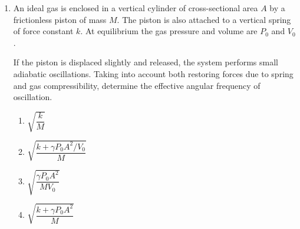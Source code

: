\documentclass[12pt]{article}
\begin{document}
\begin{enumerate}
Taking into account electromagnetic damping due to induced currents along the rod and working in the small angle approximation, determine how the natural angular frequency of oscillation is modified to first order in magnetic field strength.


\begin{enumerate}
\item $\sqrt{\dfrac{3g}{2L}}$
\item $\sqrt{\dfrac{3g}{2L}-\dfrac{3B^4L^4}{16m^2R^2}}$
\item $\sqrt{\dfrac{3g}{L}}$
\item $\sqrt{\dfrac{g}{L}}$
\end{enumerate}

\item
An ideal gas is enclosed in a vertical cylinder of cross-sectional area $A$ by a frictionless piston of mass $M$. The piston is also attached to a vertical spring of force constant $k$. At equilibrium the gas pressure and volume are $P_0$ and $V_0$.

If the piston is displaced slightly and released, the system performs small adiabatic oscillations. Taking into account both restoring forces due to spring and gas compressibility, determine the effective angular frequency of oscillation.


\begin{enumerate}
\item $\sqrt{\dfrac{k}{M}}$
\item $\sqrt{\dfrac{k+\gamma P_0A^2/V_0}{M}}$
\item $\sqrt{\dfrac{\gamma P_0A^2}{MV_0}}$
\item $\sqrt{\dfrac{k+\gamma P_0A^2}{M}}$
\end{enumerate}


\end{enumerate}
\end{document}
